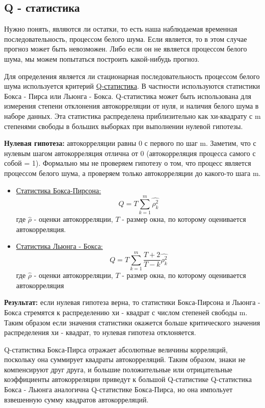 \documentclass{article}
\begin{document}
\subsection{Q - статистика}

Нужно понять, являются ли остатки, то есть наша наблюдаемая временная последовательность, процессом белого шума. Если является, то в этом случае прогноз может быть невозможен. Либо если он не является процессом белого шума, мы можем попытаться построить какой-нибудь прогноз. 

Для определения является ли стационарная последовательность процессом белого шума используется критерий \underline{Q-статистика}. В частности используются статистики Бокса - Пирса или Льюнга - Бокса. Q-статистика может быть использована для измерения степени отклонения автокорреляции от нуля, и наличия белого шума в наборе данных. Эта статистика распределена приблизительно как хи-квадрату с m степенями свободы в больших выборках при выполнении нулевой гипотезы.

\textbf{Нулевая гипотеза:}  автокорреляции равны 0 с первого по шаг m. Заметим, что с нулевым шагом автокорреляция отлична от 0 (автокорреляция процесса самого с собой = 1). Формально мы не проверяем гипотезу о том, что процесс является процессом белого шума, а проверяем только автокорреляции до какого-то шага m. 

\begin{itemize}
    \item \underline{Статистика Бокса-Пирсона:} $$ Q = T \sum^m_{k=1} \hat {\rho_k^2} $$
    где $\hat \rho$ - оценки автокорреляции, $T$ - размер окна, по которому оценивается автокорреляция. 

    \item \underline{Статистика Льюнга - Бокса:} $$ Q = T \sum^m_{k=1} \frac{T+2}{T-k} \hat {\rho_k^2} $$
где $\hat \rho$ - оценки автокорреляции, $T$ - размер окна, по которому оценивается автокорреляция

\end{itemize}


\textbf{Результат:} если нулевая гипотеза верна, то статистики  Бокса-Пирсона и Льюнга - Бокса стремятся к распределению хи - квадрат с числом степеней свободы m. Таким образом если значения статистики окажется больше критического значения распределения хи - квадрат, то нулевая гипотеза отклоняется.  

Q-статистика Бокса-Пирса отражает абсолютные величины корреляций, поскольку она суммирует квадраты автокорреляций. Таким образом, знаки не компенсируют друг друга, и большие
положительные или отрицательные коэффициенты автокорреляции приведут к большой Q-статистике
Q-статистика Бокса - Льюнга аналогична Q-статистике Бокса-Пирса, но она импольует взвешенную сумму квадратов автокорреляций. 
\end{document}
